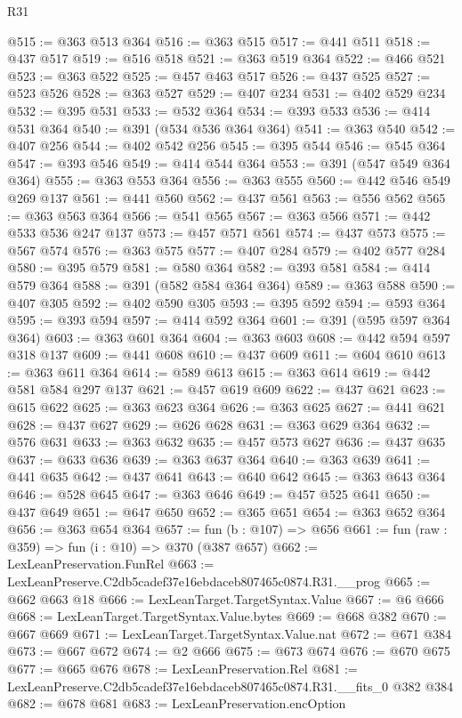 \begin{lexlean}{R31}
\begin{coremodule}
@515 := @363 @513 @364
@516 := @363 @515
@517 := @441 @511
@518 := @437 @517
@519 := @516 @518
@521 := @363 @519 @364
@522 := @466 @521
@523 := @363 @522
@525 := @457 @463 @517
@526 := @437 @525
@527 := @523 @526
@528 := @363 @527
@529 := @407 @234
@531 := @402 @529 @234
@532 := @395 @531
@533 := @532 @364
@534 := @393 @533
@536 := @414 @531 @364
@540 := @391 (@534 @536 @364 @364)
@541 := @363 @540
@542 := @407 @256
@544 := @402 @542 @256
@545 := @395 @544
@546 := @545 @364
@547 := @393 @546
@549 := @414 @544 @364
@553 := @391 (@547 @549 @364 @364)
@555 := @363 @553 @364
@556 := @363 @555
@560 := @442 @546 @549 @269 @137
@561 := @441 @560
@562 := @437 @561
@563 := @556 @562
@565 := @363 @563 @364
@566 := @541 @565
@567 := @363 @566
@571 := @442 @533 @536 @247 @137
@573 := @457 @571 @561
@574 := @437 @573
@575 := @567 @574
@576 := @363 @575
@577 := @407 @284
@579 := @402 @577 @284
@580 := @395 @579
@581 := @580 @364
@582 := @393 @581
@584 := @414 @579 @364
@588 := @391 (@582 @584 @364 @364)
@589 := @363 @588
@590 := @407 @305
@592 := @402 @590 @305
@593 := @395 @592
@594 := @593 @364
@595 := @393 @594
@597 := @414 @592 @364
@601 := @391 (@595 @597 @364 @364)
@603 := @363 @601 @364
@604 := @363 @603
@608 := @442 @594 @597 @318 @137
@609 := @441 @608
@610 := @437 @609
@611 := @604 @610
@613 := @363 @611 @364
@614 := @589 @613
@615 := @363 @614
@619 := @442 @581 @584 @297 @137
@621 := @457 @619 @609
@622 := @437 @621
@623 := @615 @622
@625 := @363 @623 @364
@626 := @363 @625
@627 := @441 @621
@628 := @437 @627
@629 := @626 @628
@631 := @363 @629 @364
@632 := @576 @631
@633 := @363 @632
@635 := @457 @573 @627
@636 := @437 @635
@637 := @633 @636
@639 := @363 @637 @364
@640 := @363 @639
@641 := @441 @635
@642 := @437 @641
@643 := @640 @642
@645 := @363 @643 @364
@646 := @528 @645
@647 := @363 @646
@649 := @457 @525 @641
@650 := @437 @649
@651 := @647 @650
@652 := @365 @651
@654 := @363 @652 @364
@656 := @363 @654 @364
@657 := fun (b : @107) => @656
@661 := fun (raw : @359) => fun (i : @10) => @370 (@387 @657)
@662 := LexLeanPreservation.FunRel
@663 := LexLeanPreserve.C2db5cadef37e16ebdaceb807465c0874.R31.__prog
@665 := @662 @663 @18
@666 := LexLeanTarget.TargetSyntax.Value
@667 := @6 @666
@668 := LexLeanTarget.TargetSyntax.Value.bytes
@669 := @668 @382
@670 := @667 @669
@671 := LexLeanTarget.TargetSyntax.Value.nat
@672 := @671 @384
@673 := @667 @672
@674 := @2 @666
@675 := @673 @674
@676 := @670 @675
@677 := @665 @676
@678 := LexLeanPreservation.Rel
@681 := LexLeanPreserve.C2db5cadef37e16ebdaceb807465c0874.R31.__fits_0 @382 @384
@682 := @678 @681
@683 := LexLeanPreservation.encOption

\end{coremodule}
\end{lexlean}
